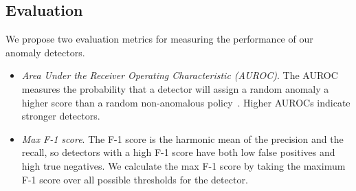 \subsection{Evaluation}
We propose two evaluation metrics for measuring the performance of our anomaly detectors. 
\begin{itemize}[leftmargin=*]
    \item  \textit{Area Under the Receiver Operating Characteristic (AUROC)}. The AUROC measures the probability that a detector will assign a random anomaly a higher score than a random non-anomalous policy~\citep{davis2006auroc}. Higher AUROCs indicate stronger detectors. %
    
    \item \textit{Max F-1 score}. The F-1 score is the harmonic mean of the precision and the recall, so detectors with a high F-1 score have both low false positives and high true negatives. We calculate the max F-1 score by taking the maximum F-1 score over all possible thresholds for the detector.
\end{itemize}




